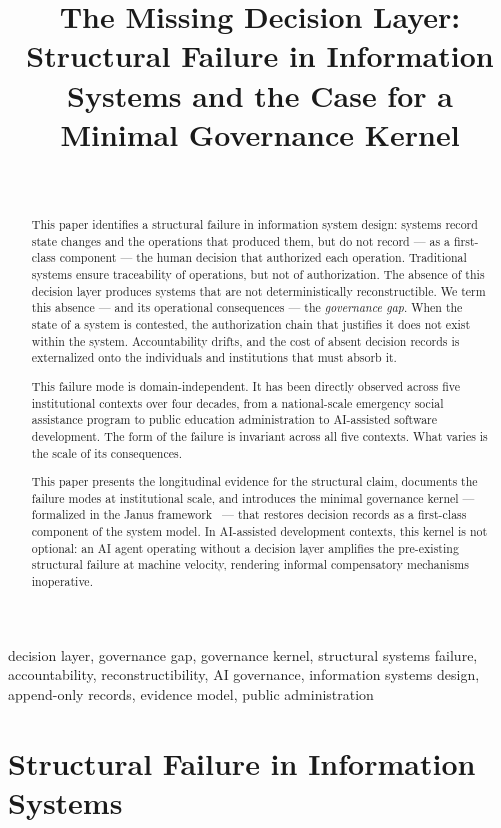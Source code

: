 \documentclass[conference]{IEEEtran}
\title{The Missing Decision Layer: Structural Failure in Information Systems and the Case for a Minimal Governance Kernel}
\author{%
  \IEEEauthorblockN{Martín Nicolás Sánchez Morales}\\
  \IEEEauthorblockA{Janus Governance Project\\
  Buenos Aires, Argentina\\
  ORCID: \url{https://orcid.org/0009-0000-4963-8847}\\
  \url{https://janusgovernance.org}}%
}
\begin{document}
\maketitle

\begin{abstract}
This paper identifies a structural failure in information system design: systems record state changes and the operations that produced them, but do not record --- as a first-class component --- the human decision that authorized each operation. Traditional systems ensure traceability of operations, but not of authorization. The absence of this decision layer produces systems that are not deterministically reconstructible. We term this absence --- and its operational consequences --- the \emph{governance gap}. When the state of a system is contested, the authorization chain that justifies it does not exist within the system. Accountability drifts, and the cost of absent decision records is externalized onto the individuals and institutions that must absorb it.

This failure mode is domain-independent. It has been directly observed across five institutional contexts over four decades, from a national-scale emergency social assistance program to public education administration to AI-assisted software development. The form of the failure is invariant across all five contexts. What varies is the scale of its consequences.

This paper presents the longitudinal evidence for the structural claim, documents the failure modes at institutional scale, and introduces the minimal governance kernel --- formalized in the Janus framework~\cite{sanchez_core,sanchez_framework} --- that restores decision records as a first-class component of the system model. In AI-assisted development contexts, this kernel is not optional: an AI agent operating without a decision layer amplifies the pre-existing structural failure at machine velocity, rendering informal compensatory mechanisms inoperative.
\end{abstract}

\begin{IEEEkeywords}
decision layer, governance gap, governance kernel, structural systems failure, accountability, reconstructibility, AI governance, information systems design, append-only records, evidence model, public administration
\end{IEEEkeywords}

\section{Structural Failure in Information Systems}
\end{document}
